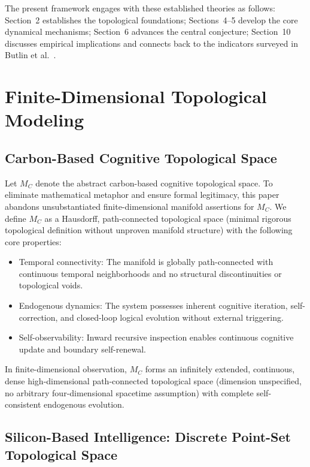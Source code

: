 \documentclass[conference]{IEEEtran}
\theoremstyle{remark}
\begin{document}
The present framework engages with these established theories as follows: Section~2 establishes the topological foundations; Sections~4--5 develop the core dynamical mechanisms; Section~6 advances the central conjecture; Section~10 discusses empirical implications and connects back to the indicators surveyed in Butlin et al.~\cite{butlin2023consciousness}.

\section{Finite-Dimensional Topological Modeling}
\subsection{Carbon-Based Cognitive Topological Space}

Let $M_C$ denote the abstract carbon-based cognitive topological space. To eliminate mathematical metaphor and ensure formal legitimacy, this paper abandons unsubstantiated finite-dimensional manifold assertions for $M_C$. We define $M_C$ as a Hausdorff, path-connected topological space (minimal rigorous topological definition without unproven manifold structure) with the following core properties:

\begin{itemize}[nosep]
    \item Temporal connectivity: The manifold is globally path-connected with continuous temporal neighborhoods and no structural discontinuities or topological voids.
    \item Endogenous dynamics: The system possesses inherent cognitive iteration, self-correction, and closed-loop logical evolution without external triggering.
    \item Self-observability: Inward recursive inspection enables continuous cognitive update and boundary self-renewal.
\end{itemize}

In finite-dimensional observation, $M_C$ forms an infinitely extended, continuous, dense high-dimensional path-connected topological space (dimension unspecified, no arbitrary four-dimensional spacetime assumption) with complete self-consistent endogenous evolution.
\subsection{Silicon-Based Intelligence: Discrete Point-Set Topological Space}
\end{document}
